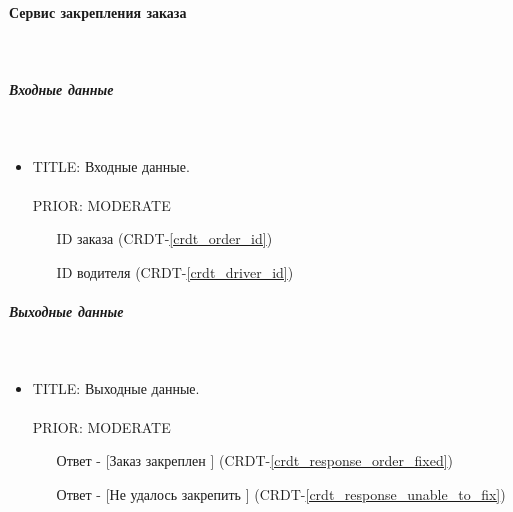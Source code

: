 \paragraph{Сервис закрепления заказа} \mbox{} \\ \label{fasten_order_service}

	\subparagraph{Входные данные} \mbox{} \\ \label{}

      \begin{itemize}

        \item{

          TITLE: Входные данные.\\
          \\
          PRIOR: MODERATE\\

        }

        \begin{itemize}
          \item [ID заказа] (CRDT-\ref{crdt_order_id})
          \item [ID водителя] (CRDT-\ref{crdt_driver_id})
        \end{itemize}

      \end{itemize}

    \subparagraph{Выходные данные} \mbox{} \\

      \begin{itemize}

        \item{

          TITLE: Выходные данные.\\
          \\
          PRIOR: MODERATE\\

        }

        \begin{itemize}
          \item [Ответ - [Заказ закреплен]] (CRDT-\ref{crdt_response_order_fixed})
          \item [Ответ - [Не удалось закрепить]] (CRDT-\ref{crdt_response_unable_to_fix})
        \end{itemize}

      \end{itemize}

